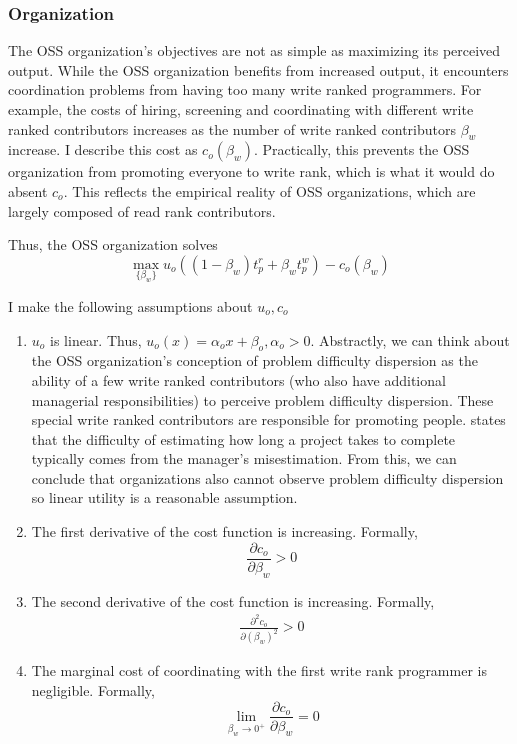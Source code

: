 \documentclass[source/paper/main.tex]{subfiles}
\begin{document}
\subsubsection{Organization}
The OSS organization's objectives are not as simple as maximizing its perceived output. While the OSS organization benefits from increased output, it encounters coordination problems from having too many write ranked programmers. For example, the costs of hiring, screening and coordinating with different write ranked contributors increases as the number of write ranked contributors $\beta_w$ increase. I describe this cost as $c_o(\beta_w)$. Practically, this prevents the OSS organization from promoting everyone to write rank, which is what it would do absent $c_o$. This reflects the empirical reality of OSS organizations, which are largely composed of read rank contributors. 

Thus, the OSS organization solves
$$\max_{\{\beta_w\}} u_o\left((1-\beta_w) t_p^r + \beta_w t_p^w\right) - c_o(\beta_w)$$ 

I make the following assumptions about $u_o, c_o$
\begin{enumerate}
    \item $u_o$ is linear. Thus, $u_o(x) = \alpha_ox + \beta_o, \alpha_o > 0$. Abstractly, we can think about the OSS organization's conception of problem difficulty dispersion as the ability of a few write ranked contributors (who also have additional managerial responsibilities) to perceive problem difficulty dispersion. These special write ranked contributors are responsible for promoting people. \cite{jr_mythical_1995} states that the difficulty of estimating how long a project takes to complete typically comes from the manager's misestimation. From this, we can conclude that organizations also cannot observe problem difficulty dispersion so linear utility is a reasonable assumption. 

    \item The first derivative of the cost function is increasing. Formally, 
    $$\frac{\partial c_o}{\partial \beta_w}>0$$
    \item  The second derivative of the cost function is increasing. Formally, 
    \begin{align}
        \frac{\partial^2 c_o}{\partial (\beta_w)^2}>0 \label{org_concave_cost}
    \end{align}
    \item The marginal cost of coordinating with the first write rank programmer is negligible. Formally,
    $$\lim_{\beta_w \to 0^+} \frac{\partial c_o}{\partial \beta_w} = 0 $$
\end{enumerate}
\end{document}
